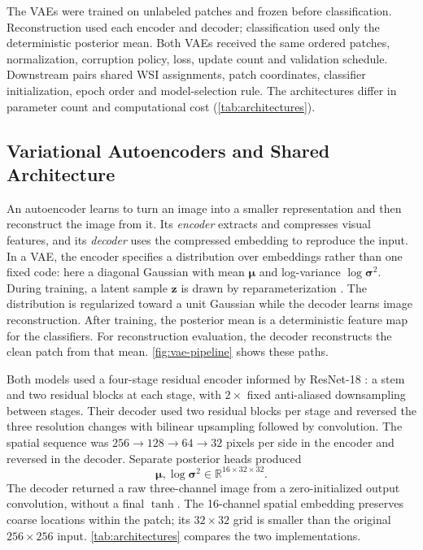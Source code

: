 \documentclass{midl}
\begin{document}
The VAEs were trained on unlabeled patches and frozen before classification. Reconstruction used each encoder and decoder; classification used only the deterministic posterior mean. Both VAEs received the same ordered patches, normalization, corruption policy, loss, update count and validation schedule. Downstream pairs shared WSI assignments, patch coordinates, classifier initialization, epoch order and model-selection rule. The architectures differ in parameter count and computational cost (\autoref{tab:architectures}).

\subsection{Variational Autoencoders and Shared Architecture}

An autoencoder learns to turn an image into a smaller representation and then reconstruct the image from it. Its \emph{encoder} extracts and compresses visual features, and its \emph{decoder} uses the compressed embedding to reproduce the input. In a VAE, the encoder specifies a distribution over embeddings rather than one fixed code: here a diagonal Gaussian with mean $\boldsymbol{\mu}$ and log-variance $\log\boldsymbol{\sigma}^2$. During training, a latent sample $\mathbf{z}$ is drawn by reparameterization \cite{kingma_auto_encoding_2014}. The distribution is regularized toward a unit Gaussian while the decoder learns image reconstruction. After training, the posterior mean is a deterministic feature map for the classifiers. For reconstruction evaluation, the decoder reconstructs the clean patch from that mean. \autoref{fig:vae-pipeline} shows these paths.

Both models used a four-stage residual encoder informed by ResNet-18 \cite{he_deep_2016}: a stem and two residual blocks at each stage, with $2\times$ fixed anti-aliased downsampling between stages. Their decoder used two residual blocks per stage and reversed the three resolution changes with bilinear upsampling followed by convolution. The spatial sequence was $256\rightarrow128\rightarrow64\rightarrow32$ pixels per side in the encoder and reversed in the decoder. Separate posterior heads produced
\begin{equation}
\boldsymbol{\mu},\log\boldsymbol{\sigma}^{2}
\in\mathbb{R}^{16\times32\times32}.
\end{equation}
The decoder returned a raw three-channel image from a zero-initialized output convolution, without a final $\tanh$. The 16-channel spatial embedding preserves coarse locations within the patch; its $32\times32$ grid is smaller than the original $256\times256$ input. \autoref{tab:architectures} compares the two implementations.
\end{document}
